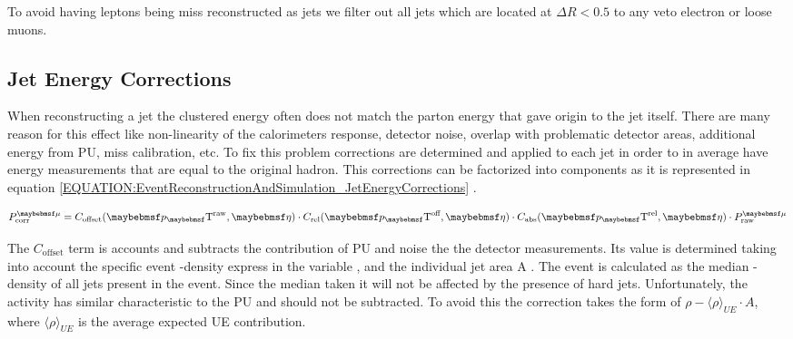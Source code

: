 
To avoid having leptons being miss reconstructed as jets we filter out all jets which are located at $\Delta R < 0.5$ to any veto electron or loose muons.

\subsection{Jet Energy Corrections}
\label{SECTION:EventReconstructionAndSimulation_Jets_JetEnergyCorrections}


When reconstructing a jet the clustered energy often does not match the parton energy that gave origin to the jet itself. There are many reason for this effect like non-linearity of the calorimeters response, detector noise, overlap with problematic detector areas, additional energy from \gls{PU}, miss calibration, etc. To fix this problem corrections are determined and applied to each jet in order to in average have energy measurements that are equal to the original hadron. This corrections can be factorized into components as it is represented in equation \ref{EQUATION:EventReconstructionAndSimulation_JetEnergyCorrections} \cite{ARTICLE:CMSDeterminationJetEnergyCalibration}.

\begin{equation}
P_{\text{corr}}^{\mu} = C_{\text{offset}}(\pT^{\text{raw}},\eta) \cdot C_{\text{rel}}(\pT^{\text{off}},\eta) \cdot C_{\text{abs}}(\pT^{\text{rel}},\eta) \cdot P_{\text{raw}}^{\mu}
\label{EQUATION:EventReconstructionAndSimulation_JetEnergyCorrections}
\end{equation}

The $C_{\text{offset}}$ term is accounts and subtracts the contribution of \gls{PU} and noise the the detector measurements. Its value is determined taking into account the specific event \pt-density express in the variable \rho, and the individual jet area A \cite{ARTICLE:PileupSubtractionJetAreas}. The event \rho is calculated as the median \pt-density of all jets present in the event. Since the median taken it will not be affected by the presence of hard jets. Unfortunately, the  activity has similar characteristic to the \gls{PU} and should not be subtracted. To avoid this the correction takes the form of $\rho - \langle \rho \rangle_{UE} \cdot A$, where $\langle \rho \rangle_{UE}$ is the average expected \gls{UE} contribution.

